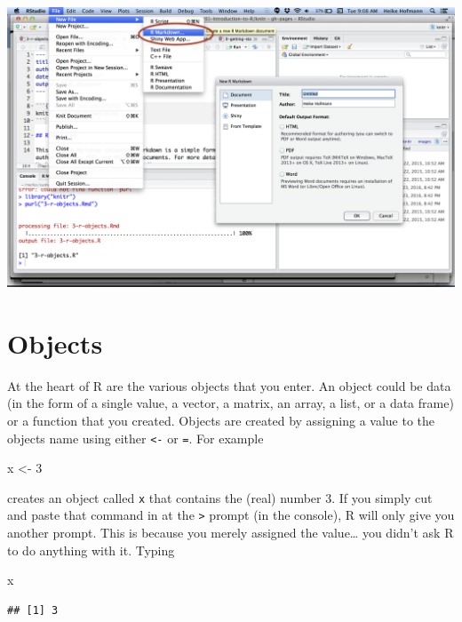 \documentclass[
]{book}
\newenvironment{Shaded}{\begin{snugshade}}{\end{snugshade}}
\newcommand{\DecValTok}[1]{\textcolor[rgb]{0.00,0.00,0.81}{#1}}
\newcommand{\NormalTok}[1]{#1}
\newcommand{\OtherTok}[1]{\textcolor[rgb]{0.56,0.35,0.01}{#1}}
\begin{document}
\includegraphics[width=24in]{img/hello-rmarkdown}

\hypertarget{objects}{%
\section{Objects}\label{objects}}

At the heart of R are the various objects that you enter. An object could be data (in the form of a single value, a vector, a matrix, an array, a list, or a data frame) or a function that you created. Objects are created by assigning a value to the objects name using either \texttt{\textless{}-} or \texttt{=}. For example

\begin{Shaded}
\begin{Highlighting}[]
\NormalTok{x }\OtherTok{\textless{}{-}} \DecValTok{3}
\end{Highlighting}
\end{Shaded}

creates an object called \texttt{x} that contains the (real) number 3. If you simply cut and paste that command in at the \texttt{\textgreater{}} prompt (in the console), R will only give you another prompt. This is because you merely assigned the value\ldots{} you didn't ask R to do anything with it. Typing

\begin{Shaded}
\begin{Highlighting}[]
\NormalTok{x}
\end{Highlighting}
\end{Shaded}

\begin{verbatim}
## [1] 3
\end{verbatim}
\end{document}

